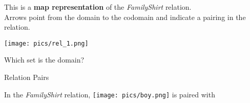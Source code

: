 \documentclass{ximera}
\author{Lee Wayand}
\begin{document}
\begin{exercise}

This is a \textbf{map representation} of the \textit{FamilyShirt} relation. \\


Arrows point from the domain to the codomain and indicate a pairing in the relation.


\begin{image}
\texttt{[image: pics/rel\_1.png]}
\end{image}


Which set is the domain?



\begin{multipleChoice}
\end{multipleChoice}



\begin{question} Relation Pairs


In the \textit{FamilyShirt} relation, \texttt{[image: pics/boy.png]} is paired with





\begin{multipleChoice}
\end{multipleChoice}
\end{question}



\end{exercise}
\end{document}
